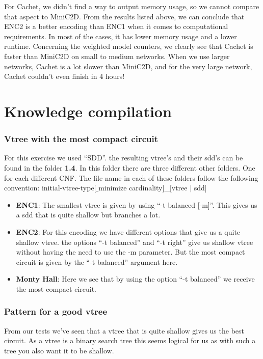 For Cachet, we didn't find a way to output memory usage, so we cannot compare that aspect to MiniC2D.
From the results listed above, we can conclude that ENC2 is a better encoding than ENC1 when it comes to computational requirements. In most of the cases, it has lower memory usage and a lower runtime.
Concerning the weighted model counters, we clearly see that Cachet is faster than MiniC2D on small to medium networks. When we use larger networks, Cachet is a lot slower than MiniC2D, and for the very large network, Cachet couldn't even finish in 4 hours!

\section{Knowledge compilation}
\subsubsection{Vtree with the most compact circuit}
For this exercise we used ``SDD''. the resulting vtree's and their sdd's can be found in the folder \textbf{1.4}.
In this folder there are three different other folders. One for each different CNF.
The file name in each of these folders follow the following convention:
initial-vtree-type$[\_$minimize cardinality$]$\_$[$vtree $\vert$ sdd$]$
\begin{itemize}
    \item \textbf{ENC1}: The smallest vtree is given by using ``-t balanced [-m]''. This gives us a sdd that is quite shallow but branches a lot.
    \item \textbf{ENC2}: For this encoding we have different options that give us a quite shallow vtree. the options ``-t balanced'' and ``-t right'' give us shallow vtree without having the need to use the -m parameter. But the most compact circuit is given by the ``-t balanced'' argument here.
    \item \textbf{Monty Hall}: Here we see that by using the option ``-t balanced'' we receive the most compact circuit.
\end{itemize}

\subsubsection{Pattern for a good vtree}
From our tests we've seen that a vtree that is quite shallow gives us the best circuit. As a vtree is a binary search tree this seems logical for us as with such a tree you also want it to be shallow.
